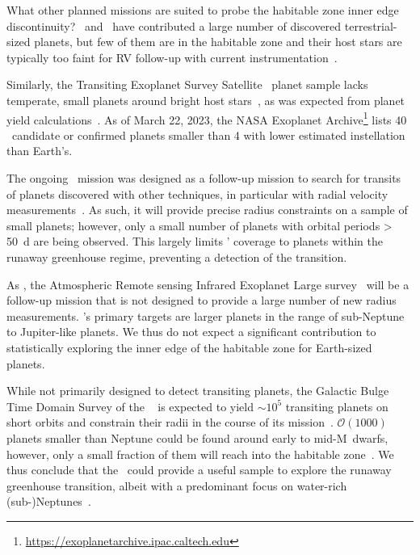 \documentclass[twocolumn,twocolappendix,linenumbers]{aastex631}
\begin{document}
What other planned missions are suited to probe the habitable zone inner edge discontinuity?
\kepler\ and \ktwo\ have contributed a large number of discovered terrestrial-sized planets, but few of them are in the habitable zone and their host stars are typically too faint for RV follow-up with current instrumentation~\citep{Dressing2015}.

Similarly, the Transiting Exoplanet Survey Satellite~\citep[\tess,][]{Ricker2014a} planet sample lacks temperate, small planets around bright host stars~\citep{Ment2023}, as was expected from planet yield calculations~\citep{Barclay2018}.
As of March 22, 2023, the NASA Exoplanet Archive\footnote{\url{https://exoplanetarchive.ipac.caltech.edu}} lists 40 \tess\ candidate or confirmed planets smaller than \SI{4}{\rEarth} with lower estimated instellation than Earth's.

The ongoing \cheops\ mission was designed as a follow-up mission to search for transits of planets discovered with other techniques, in particular with radial velocity measurements~\citep{Benz2021}.
As such, it will provide precise radius constraints on a sample of small planets; however, only a small number of planets with orbital periods \SI{> 50}{\day} are being observed.
This largely limits \cheops' coverage to planets within the runaway greenhouse regime, preventing a detection of the transition.

As \cheops, the Atmospheric Remote sensing Infrared Exoplanet Large survey~\citep[\ariel,][]{Puig2016} will be a follow-up mission that is not designed to provide a large number of new radius measurements.
\ariel's primary targets are larger planets in the range of sub-Neptune to Jupiter-like planets.
We thus do not expect a significant contribution to statistically exploring the inner edge of the habitable zone for Earth-sized planets.

While not primarily designed to detect transiting planets, the Galactic Bulge Time Domain Survey of the \rst~\citep{Spergel2015} is expected to yield $\sim 10^5$ transiting planets on short orbits and constrain their radii in the course of its mission~\citep{Montet2017}.
$\mathcal{O} (1000)$ planets smaller than Neptune could be found around early to mid-M~dwarfs, however, only a small fraction of them will reach into the habitable zone~\citep{Tamburo2023}.
We thus conclude that the \rst\ could provide a useful sample to explore the runaway greenhouse transition, albeit with a predominant focus on water-rich (sub-)Neptunes~\citep[e.g.,][]{Pierrehumbert2022}.
\end{document}
